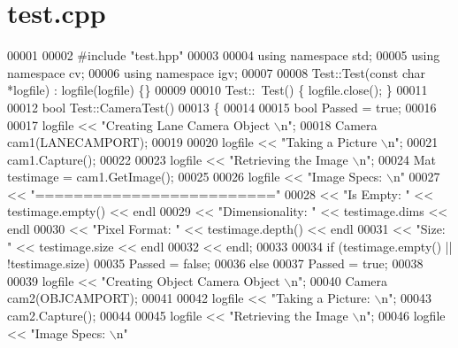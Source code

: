 \hypertarget{test_8cpp_source}{}\section{test.\+cpp}
\label{test_8cpp_source}

\begin{DoxyCode}
00001 
00002 \textcolor{preprocessor}{#}\textcolor{preprocessor}{include} \textcolor{preprocessor}{"test.hpp"}
00003 
00004 \textcolor{keyword}{using} \textcolor{keyword}{namespace} std;
00005 \textcolor{keyword}{using} \textcolor{keyword}{namespace} cv;
00006 \textcolor{keyword}{using} \textcolor{keyword}{namespace} igv;
00007 
00008 Test::Test(\textcolor{keyword}{const} \textcolor{keywordtype}{char} *logfile) : logfile(logfile) \{\}
00009 
00010 Test::~Test() \{ logfile.close(); \}
00011 
00012 \textcolor{keywordtype}{bool} Test::CameraTest()
00013 \{
00014 
00015   \textcolor{keywordtype}{bool} Passed = \textcolor{keyword}{true};
00016 
00017   logfile << \textcolor{stringliteral}{"Creating Lane Camera Object \(\backslash\)n"};
00018   Camera cam1(LANECAMPORT);
00019 
00020   logfile << \textcolor{stringliteral}{"Taking a Picture \(\backslash\)n"};
00021   cam1.Capture();
00022 
00023   logfile << \textcolor{stringliteral}{"Retrieving the Image \(\backslash\)n"};
00024   Mat testimage = cam1.GetImage();
00025 
00026   logfile << \textcolor{stringliteral}{"Image Specs: \(\backslash\)n"}
00027           << \textcolor{stringliteral}{"========================="}
00028           << \textcolor{stringliteral}{"Is Empty:       "} << testimage.empty() << endl
00029           << \textcolor{stringliteral}{"Dimensionality: "} << testimage.dims << endl
00030           << \textcolor{stringliteral}{"Pixel Format:   "} << testimage.depth() << endl
00031           << \textcolor{stringliteral}{"Size:           "} << testimage.size << endl
00032           << endl;
00033 
00034   \textcolor{keywordflow}{if} (testimage.empty() || !testimage.size)
00035     Passed = \textcolor{keyword}{false};
00036   \textcolor{keywordflow}{else}
00037     Passed = \textcolor{keyword}{true};
00038 
00039   logfile << \textcolor{stringliteral}{"Creating Object Camera Object \(\backslash\)n"};
00040   Camera cam2(OBJCAMPORT);
00041 
00042   logfile << \textcolor{stringliteral}{"Taking a Picture: \(\backslash\)n"};
00043   cam2.Capture();
00044 
00045   logfile << \textcolor{stringliteral}{"Retrieving the Image \(\backslash\)n"};
00046   logfile << \textcolor{stringliteral}{"Image Specs: \(\backslash\)n"}

\end{DoxyCode}
